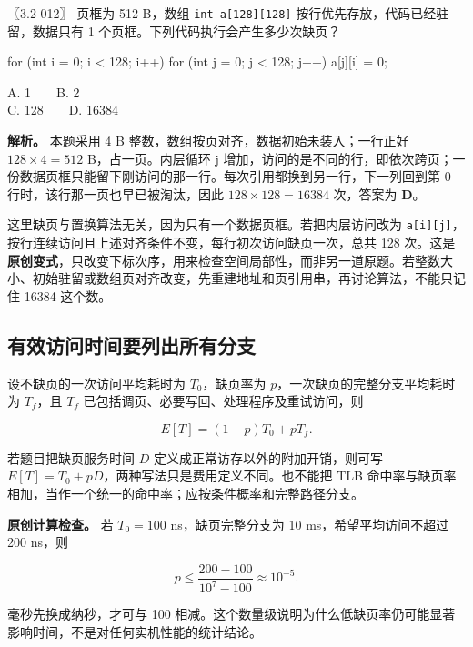 〖3.2-012〗 页框为 512 B，数组 \texttt{int a[\allowbreak{}128]\allowbreak{}[\allowbreak{}128]\allowbreak{}} 按行优先存放，代码已经驻留，数据只有 1 个页框。下列代码执行会产生多少次缺页？

\par\medskip\noindent\begin{minipage}{\linewidth}
\begin{codeblock}[language=C]
for (int i = 0; i < 128; i++)
    for (int j = 0; j < 128; j++)
        a[j][i] = 0;
\end{codeblock}
\end{minipage}\par\medskip

A. 1　　B. 2\\
C. 128　　D. 16384

\textbf{解析。} 本题采用 4 B 整数，数组按页对齐，数据初始未装入；一行正好 \(128\times4=512\) B，占一页。内层循环 j 增加，访问的是不同的行，即依次跨页；一份数据页框只能留下刚访问的那一行。每次引用都换到另一行，下一列回到第 0 行时，该行那一页也早已被淘汰，因此 \(128\times128=16384\) 次，答案为 \textbf{D}。

这里缺页与置换算法无关，因为只有一个数据页框。若把内层访问改为 \texttt{a[\allowbreak{}i]\allowbreak{}[\allowbreak{}j]\allowbreak{}}，按行连续访问且上述对齐条件不变，每行初次访问缺页一次，总共 128 次。这是\textbf{原创变式}，只改变下标次序，用来检查空间局部性，而非另一道原题。若整数大小、初始驻留或数组页对齐改变，先重建地址和页引用串，再讨论算法，不能只记住 16384 这个数。

\subsection{有效访问时间要列出所有分支}\label{OS03-auto-5}

设不缺页的一次访问平均耗时为 \(T_0\)，缺页率为 \(p\)，一次缺页的完整分支平均耗时为 \(T_f\)，且 \(T_f\) 已包括调页、必要写回、处理程序及重试访问，则

\[E[T]=(1-p)T_0+pT_f.\]

若题目把缺页服务时间 \(D\) 定义成正常访存以外的附加开销，则可写 \(E[T]=T_0+pD\)，两种写法只是费用定义不同。也不能把 TLB 命中率与缺页率相加，当作一个统一的命中率；应按条件概率和完整路径分支。

\textbf{原创计算检查。} 若 \(T_0=100\) ns，缺页完整分支为 10 ms，希望平均访问不超过 200 ns，则

\[p\le\frac{200-100}{10^7-100}\approx10^{-5}.\]

毫秒先换成纳秒，才可与 100 相减。这个数量级说明为什么低缺页率仍可能显著影响时间，不是对任何实机性能的统计结论。

